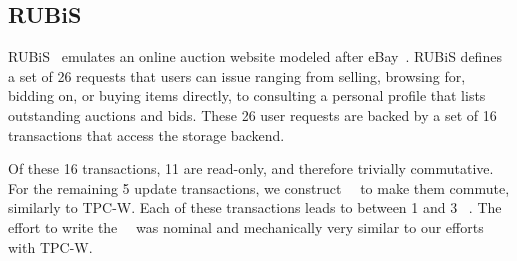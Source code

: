 \subsection{RUBiS}
\label{sect:caserubis}

RUBiS~\cite{RUBiS} emulates an online auction website modeled after
eBay~\cite{ebayUrl}. RUBiS defines a set of 26 requests that users can issue
ranging from selling, browsing for, bidding on, or buying items directly,
to consulting a personal profile that lists outstanding auctions and bids.  These 26 user
requests are backed by a set of 16 transactions that access the
storage backend.
% 

Of these 16 transactions, 11 are read-only, and therefore trivially
commutative. For the remaining 5 update transactions, we construct
\shadow\ \transactions\ to make them commute, similarly to TPC-W. Each of
these transactions leads to between 1 and 3 \shadow\ \operations.
The effort to write the \shadow\ \operations\ was nominal and mechanically very similar to our
efforts with TPC-W.


